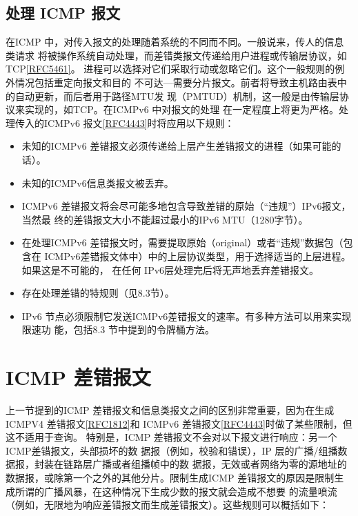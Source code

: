 \subsection{处理 ICMP 报文}
在ICMP 中，对传入报文的处理随着系统的不同而不同。一般说来，传人的信息类请求
将被操作系统自动处理，而差错类报文传递给用户进程或传输层协议，如 TCP\href{https://www.rfc-editor.org/rfc/rfc5461}{[RFC5461]}。
进程可以选择对它们采取行动或忽略它们。这个一般规则的例外情况包括重定向报文和目的
不可达—需要分片报文。前者将导致主机路由表中的自动更新，而后者用于路径MTU发
现（PMTUD）机制，这一般是由传输层协议来实现的，如TCP。在ICMPv6 中对报文的处理
在一定程度上将更为严格。处理传入的ICMPv6 报文\href{https://www.rfc-editor.org/rfc/rfc4443}{[RFC4443]}时将应用以下规则：

\begin{itemize}
	\item 未知的ICMPv6 差错报文必须传递给上层产生差错报文的进程（如果可能的话）。
	\item 未知的ICMPv6信息类报文被丢弃。
	\item ICMPv6 差错报文将会尽可能多地包含导致差错的原始（“违规”）IPv6报文，当然最
	      终的差错报文大小不能超过最小的IPv6 MTU（1280字节）。
	\item 在处理ICMPv6 差错报文时，需要提取原始（original）或者“违规”数据包（包含在
	      ICMPv6差错报文体中）中的上层协议类型，用于选择适当的上层进程。如果这是不可能的，
	      在任何 IPv6层处理完后将无声地丢弃差错报文。
	\item 存在处理差错的特规则（见8.3节）。
	\item IPv6 节点必须限制它发送ICMPv6差错报文的速率。有多种方法可以用来实现限速功
	      能，包括8.3 节中提到的令牌桶方法。
\end{itemize}

\section{ICMP 差错报文}

上一节提到的ICMP 差错报文和信息类报文之间的区别非常重要，因为在生成ICMPV4
差错报文\href{https://www.rfc-editor.org/rfc/rfc1812}{[RFC1812]}和 ICMPv6 差错报文\href{https://www.rfc-editor.org/rfc/rfc4443}{[RFC4443]}时做了某些限制，但这不适用于查询。
特别是，ICMP 差错报文不会对以下报文进行响应：另一个ICMP差错报文，头部损坏的数
据报（例如，校验和错误），IP 层的广播/组播数据报，封装在链路层广播或者组播帧中的数
据报，无效或者网络为零的源地址的数据报，或除第一个之外的其他分片。限制生成ICMP
差错报文的原因是限制生成所谓的广播风暴，在这种情况下生成少数的报文就会造成不想要
的流量喷流（例如，无限地为响应差错报文而生成差错报文）。这些规则可以概括如下：

